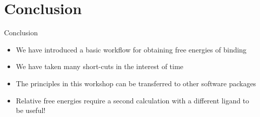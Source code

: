 \section{Conclusion}
\begin{frame}{Conclusion}
\begin{itemize}
\item We have introduced a basic workflow for obtaining free energies of binding
\item We have taken many short-cuts in the interest of time
\item The principles in this workshop can be transferred to other software packages
\item Relative free energies require a second calculation with a different ligand to be useful!
\end{itemize}
\end{frame}

